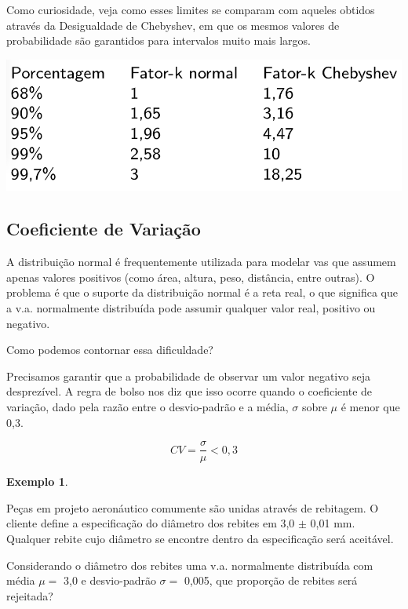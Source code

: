 \documentclass[
]{book}
\theoremstyle{definition}
\theoremstyle{definition}
\newtheorem{example}{Exemplo}[chapter]
\theoremstyle{definition}
\theoremstyle{remark}
\begin{document}
Como curiosidade, veja como esses limites se comparam com aqueles obtidos através da Desigualdade de Chebyshev, em que os mesmos valores de probabilidade são garantidos para intervalos muito mais largos.

\begin{center}\includegraphics[width=0.7\linewidth]{img/distr-normal-regra-empirica-tabela} \end{center}

\hypertarget{coeficiente-de-variauxe7uxe3o}{%
\subsection*{Coeficiente de Variação}\label{coeficiente-de-variauxe7uxe3o}}

A distribuição normal é frequentemente utilizada para modelar vas que assumem apenas valores positivos (como área, altura, peso, distância, entre outras). O problema é que o suporte da distribuição normal é a reta real, o que significa que a v.a. normalmente distribuída pode assumir qualquer valor real, positivo ou negativo.

Como podemos contornar essa dificuldade?

Precisamos garantir que a probabilidade de observar um valor negativo seja desprezível. A regra de bolso nos diz que isso ocorre quando o coeficiente de variação, dado pela razão entre o desvio-padrão e a média, \(\sigma\) sobre \(\mu\) é menor que 0,3.

\[CV = \frac{\sigma}{\mu} <  0,3\]

\begin{example}
\protect\hypertarget{exm:unnamed-chunk-10}{}{\label{exm:unnamed-chunk-10} }
\end{example}

Peças em projeto aeronáutico comumente são unidas através de rebitagem. O cliente define a especificação do diâmetro dos rebites em 3,0 \(\pm\) 0,01 mm. Qualquer rebite cujo diâmetro se encontre dentro da especificação será aceitável.

Considerando o diâmetro dos rebites uma v.a. normalmente distribuída com média \(\mu =\) 3,0 e desvio-padrão \(\sigma =\) 0,005, que proporção de rebites será rejeitada?
\end{document}
